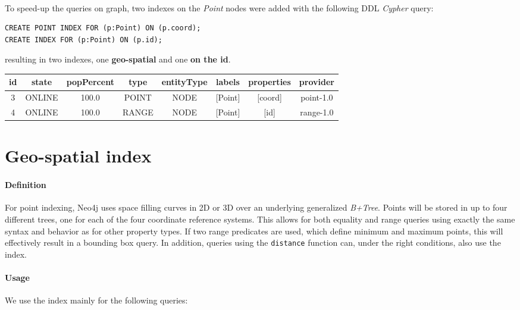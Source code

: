 \paragraph{}
To speed-up the queries on graph, two indexes on the \textit{Point} nodes were added with the following DDL \textit{Cypher} query:

\begin{lstlisting}
CREATE POINT INDEX FOR (p:Point) ON (p.coord);
CREATE INDEX FOR (p:Point) ON (p.id);
\end{lstlisting}

resulting in two indexes, one \textbf{geo-spatial} and one \textbf{on the id}.

\begin{tabular}{|c|c|c|c|c|c|c|c|}
	\hline
	
	id & state & popPercent & type & entityType & labels & properties & provider \\
	
	\hline
	\hline
	
	3 & ONLINE & 100.0 & POINT & NODE & [Point] & [coord] & point-1.0 \\
	
	\hline
	
	4 & ONLINE & 100.0 & RANGE & NODE & [Point] & [id] & range-1.0 \\
	
	\hline
\end{tabular}

\section{Geo-spatial index}

\paragraph{Definition}
For point indexing, Neo4j uses space filling curves in 2D or 3D over an 
underlying generalized \textit{B+Tree}. Points will be stored in up to four 
different trees, one for each of the four coordinate reference systems. This 
allows for both equality and range queries using exactly the same syntax and 
behavior as for other property types. If two range predicates are used, which 
define minimum and maximum points, this will effectively result in a bounding 
box query. In addition, queries using the \texttt{distance} function can, under 
the right conditions, also use the index.

\paragraph{Usage}
We use the index mainly for the following queries:

